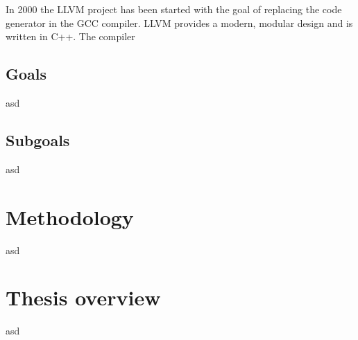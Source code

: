 In 2000 the LLVM project has been started with the goal of replacing the code generator in the GCC compiler. LLVM provides a modern, modular design and is written in C++. The compiler 

\subsection{Goals}
asd
\subsection{Subgoals}
asd
\section{Methodology}
asd
\section{Thesis overview}
asd


\acresetall
